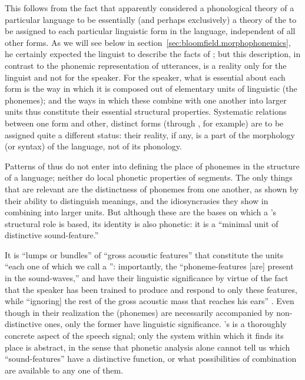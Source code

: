 This follows from the fact that {\Bloomfield} apparently considered a
phonological theory of a particular language to be essentially (and
perhaps exclusively) a theory of the  to be assigned to
each particular linguistic form in the language, independent of all
other forms. As we will see below in
section~\ref{sec:bloomfield.morphophonemics}, he certainly expected
the linguist to describe the facts of ; but this
description, in {contrast} to the phonemic representation of utterances,
is a reality only for the linguist and not for the speaker. For the
speaker, what is essential about each form is the way in which it is
composed out of elementary units of linguistic  (the
phonemes); and the ways in which these combine with one another into
larger units thus constitute their essential structural
properties. Systematic relations between one form and other, distinct
forms (through , for example) are to be assigned quite a
different status: their reality, if any, is a part of the morphology
(or syntax) of the language, not of its phonology.

Patterns of  thus do not enter into defining the place of
phonemes in the structure of a language; neither do local phonetic
properties of segments. The only things that are relevant are the
distinctness of phonemes from one another, as shown by their ability
to distinguish meanings, and the idiosyncrasies they show in combining
into larger units. But although these are the bases on which a
's structural role is based, its identity is also phonetic: it
is a ``minimal unit of distinctive sound-feature.''

It is ``lumps or bundles'' of ``gross acoustic features'' that constitute
the units ``each one of which we call a '': importantly, the
``phoneme-features [are] present in the sound-waves,'' and have their
linguistic significance by virtue of the fact that the speaker has
been trained to produce and respond to only these features, while
``ignoring] the rest of the gross acoustic mass that reaches his ears''
\citep[79]{bloomfield:lg}. Even though in their realization the
 (phonemes) are necessarily accompanied by
non-distinctive ones, only the former have linguistic
significance. {\Bloomfield}'s  is a thoroughly concrete aspect of
the speech signal; only the system within which it finds its place is
abstract, in the sense that phonetic analysis alone cannot tell us
which ``sound-features'' have a distinctive function, or what
possibilities of combination are available to any one of them.

